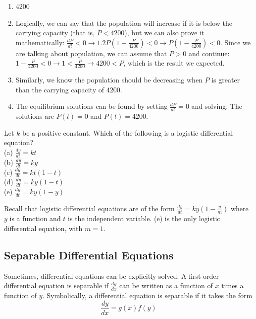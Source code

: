 \begin{Answer}[ref = logdiff1]
\begin{enumerate}
\item 4200
\item Logically, we can say that the population will increase if it is below 
the carrying capacity (that is, $P < 4200$), but we can also prove it 
mathematically: $\frac{dP}{dt} < 0 \rightarrow 1.2P \left( 1 - \frac{P}{4200} 
\right) < 0 \rightarrow P \left( 1 - \frac{P}{4200} \right) < 0$. Since we are 
talking about population, we can assume that $P > 0$ and continue: $1 - 
\frac{P}{4200} < 0 \rightarrow 1 < \frac{P}{4200} \rightarrow 4200 < P$, which 
is the result we expected. 
\item Similarly, we know the population should be decreasing when $P$ is 
greater than the carrying capacity of $4200$.
\item The equilibrium solutions can be found by setting $\frac{dP}{dt} = 0$ 
and solving. The solutions are $P(t) = 0$ and $P(t) = 4200$. 
\end{enumerate}
\end{Answer}

\begin{Exercise} Let $k$ be a positive constant. 
Which of the following is a logistic differential equation?\\
(a) $\frac{dy}{dt} = kt$\\
(b) $\frac{dy}{dt} = ky$\\
(c) $\frac{dy}{dt} = kt(1 - t)$\\
(d) $\frac{dy}{dt} = ky(1 - t)$\\
(e) $\frac{dy}{dt} = ky(1 - y)$
\end{Exercise}

\begin{Answer}[ref = logdiff2]
Recall that logistic differential equations are of the form $\frac{dy}{dt} = 
ky(1 - \frac{y}{m})$ where $y$ is a function and $t$ is the independent 
variable. (e) is the only logistic differential equation, with $m = 1$. 
\end{Answer}


\subsection{Separable Differential Equations}
Sometimes, differential equations can be explicitly solved. A 
first-order differential equation is separable if $\frac{dy}{dx}$ can 
be written as a function of $x$ times a function of $y$. Symbolically, 
a differential equation is separable if it takes the form 
$$\frac{dy}{dx} = g(x)f(y)$$

